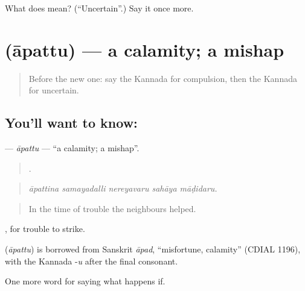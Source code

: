 \begin{tcolorbox}[breakable,colback=teal!4,colframe=teal!35!black,title={Before you move on}]
What does  mean? (\textquotedblleft{}Uncertain\textquotedblright{}.) Say it once more.
\end{tcolorbox}
\section[\texorpdfstring{\kn{ಆಪತ್ತು} (āpattu)}{ಆಪತ್ತು (āpattu)}]{ (āpattu) — a calamity; a mishap}

\label{lesson:KA-C420-apattu}



\begin{quote}
Before the new one: say the Kannada for compulsion, then the Kannada for uncertain.
\end{quote}

\subsection*{You'll want to know: }
\textbf{} — \emph{āpattu} — \textquotedblleft{}a calamity; a mishap\textquotedblright{}.

\begin{quote}
    .
\end{quote}

\begin{quote}
\emph{āpattina samayadalli nereyavaru sahāya māḍidaru.}
\end{quote}

\begin{quote}
In the time of trouble the neighbours helped.
\end{quote}

 , for trouble to strike.

\begin{cousinweb}
\textbf{} (\emph{āpattu}) is borrowed from Sanskrit \emph{āpad}, \textquotedblleft{}misfortune, calamity\textquotedblright{} (CDIAL 1196), with the Kannada -\emph{u} after the final consonant.
\end{cousinweb}

\begin{grammarlens}[title={What you've built}]
One more word for saying what happens if.
\end{grammarlens}

